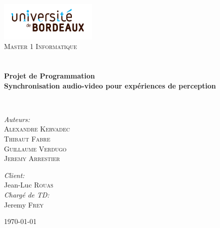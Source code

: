 \begin{titlepage}
\begin{center}

\includegraphics[width=0.35\textwidth]{./logo}~\\[1cm]

\textsc{\LARGE Master 1 Informatique}\\[1.5cm]

\textsc{\Large }\\[0.5cm]

\HRule \\[0.4cm]

{\huge \bfseries Projet de Programmation\\
Synchronisation audio-video pour expériences de perception \\[0.4cm] }

\HRule \\[1.5cm]

\begin{minipage}{0.4\textwidth}
\begin{flushleft} \large
\emph{Auteurs:}\\
\textsc{Alexandre Kervadec}\\
\textsc{Thibaut Fabre}\\
\textsc{Guillaume Verdugo}\\
\textsc{Jeremy Arrestier}
\end{flushleft}
\end{minipage}
\begin{minipage}{0.4\textwidth}
\begin{flushright} \large
\emph{Client:} \\
Jean-Luc \textsc{Rouas}\\
\emph{Chargé de TD:} \\
Jeremy \textsc{Frey}
\end{flushright}
\end{minipage}

\vfill

{\large \today}

\end{center}
\end{titlepage}